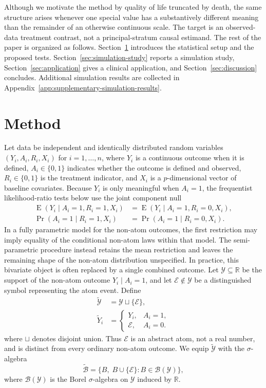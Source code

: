 \documentclass[11pt]{article}
\DeclareMathOperator*{\E}{E}
\begin{document}
Although we motivate the method by quality of life truncated by death, the same structure arises whenever one special value has a substantively different meaning than the remainder of an otherwise continuous scale. The target is an observed-data treatment contrast, not a principal-stratum causal estimand. The rest of the paper is organized as follows. Section~\ref{sec:method} introduces the statistical setup and the proposed tests. Section~\ref{sec:simulation-study} reports a simulation study, Section~\ref{sec:application} gives a clinical application, and Section~\ref{sec:discussion} concludes. Additional simulation results are collected in Appendix~\ref{app:supplementary-simulation-results}.

\section{Method}\label{sec:method}


Let data be independent and identically distributed random variables $(Y_i, A_i, R_i, X_i)$ for $i = 1, \ldots, n$, where $Y_i$ is a continuous outcome when it is defined, $A_i \in \{0,1\}$ indicates whether the outcome is defined and observed, $R_i \in \{0,1\}$ is the treatment indicator, and $X_i$ is a $p$-dimensional vector of baseline covariates. Because $Y_i$ is only meaningful when $A_i = 1$, the frequentist likelihood-ratio tests below use the joint component null
\begin{align*}
  \E(Y_i \mid A_i = 1, R_i = 1, X_i)
  &= \E(Y_i \mid A_i = 1, R_i = 0, X_i),\\
  \Pr(A_i = 1 \mid R_i = 1, X_i)
  &= \Pr(A_i = 1 \mid R_i = 0, X_i).
\end{align*}
In a fully parametric model for the non-atom outcomes, the first restriction may imply equality of the conditional non-atom laws within that model. The semi-parametric procedure instead retains the mean restriction and leaves the remaining shape of the non-atom distribution unspecified.
In practice, this bivariate object is often replaced by a single combined outcome. Let $\mathcal{Y}\subseteq\mathbb{R}$ be the support of the non-atom outcome $Y_i\mid A_i=1$, and let $\mathcal{E}\notin\mathcal{Y}$ be a distinguished symbol representing the atom event. Define
\begin{align*}
  \widetilde{\mathcal{Y}}
  &=
  \mathcal{Y}\sqcup\{\mathcal{E}\},\\
  \widetilde{Y}_i
  &=
  \begin{cases}
    Y_i, & A_i=1,\\
    \mathcal{E}, & A_i=0.
  \end{cases}
\end{align*}
where $\sqcup$ denotes disjoint union. Thus $\mathcal{E}$ is an abstract atom, not a real number, and is distinct from every ordinary non-atom outcome. We equip $\widetilde{\mathcal{Y}}$ with the $\sigma$-algebra
\[
  \widetilde{\mathcal{B}} = \{B,\; B \cup \{\mathcal{E}\} : B \in \mathcal{B}(\mathcal{Y})\},
\]
where $\mathcal{B}(\mathcal{Y})$ is the Borel $\sigma$-algebra on $\mathcal{Y}$ induced by $\mathbb{R}$.
\end{document}
